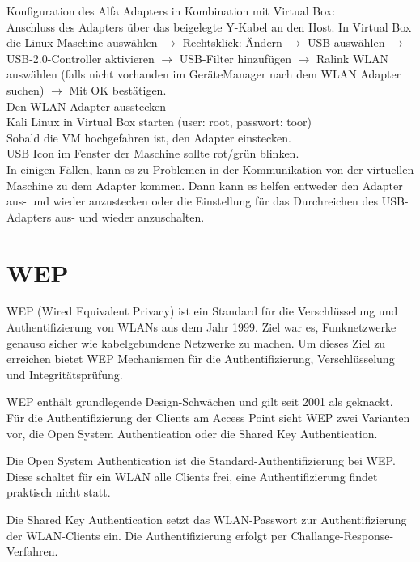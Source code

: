 Konfiguration des Alfa Adapters in Kombination mit Virtual Box:\\

Anschluss des Adapters über das beigelegte Y-Kabel an den Host.
In Virtual Box die Linux Maschine auswählen $\rightarrow$ Rechtsklick: Ändern $\rightarrow$ USB auswählen $\rightarrow$ USB-2.0-Controller aktivieren $\rightarrow$ USB-Filter hinzufügen
$\rightarrow$ Ralink WLAN auswählen (falls nicht vorhanden im GeräteManager nach dem WLAN Adapter suchen) $\rightarrow$ Mit OK bestätigen.\\
Den WLAN Adapter ausstecken\\

Kali Linux in Virtual Box starten (user: root, passwort: toor)\\
Sobald die VM hochgefahren ist, den Adapter einstecken.\\
USB Icon im Fenster der Maschine sollte rot/grün blinken.\\ %

In einigen Fällen, kann es zu Problemen in der Kommunikation von der virtuellen Maschine zu dem Adapter kommen. 
Dann kann es helfen entweder den Adapter aus- und wieder anzustecken oder die Einstellung für das Durchreichen des USB-Adapters aus- und wieder anzuschalten.


\section{WEP}
WEP (Wired Equivalent Privacy) ist ein Standard für die Verschlüsselung und Authentifizierung von WLANs aus dem Jahr 1999. Ziel war es, Funknetzwerke genauso sicher wie kabelgebundene Netzwerke zu machen. Um dieses Ziel zu erreichen bietet WEP Mechanismen für die Authentifizierung, Verschlüsselung und Integritätsprüfung. 

WEP enthält grundlegende Design-Schwächen und gilt seit 2001 als geknackt. 
Für die Authentifizierung der Clients am Access Point sieht WEP zwei Varianten vor, die Open System Authentication oder die Shared Key Authentication. 

Die Open System Authentication ist die Standard-Authentifizierung bei WEP. Diese schaltet für ein WLAN alle Clients frei, eine Authentifizierung findet praktisch nicht statt.

Die Shared Key Authentication setzt das WLAN-Passwort zur Authentifizierung der WLAN-Clients ein. Die Authentifizierung erfolgt per Challange-Response-Verfahren. 

